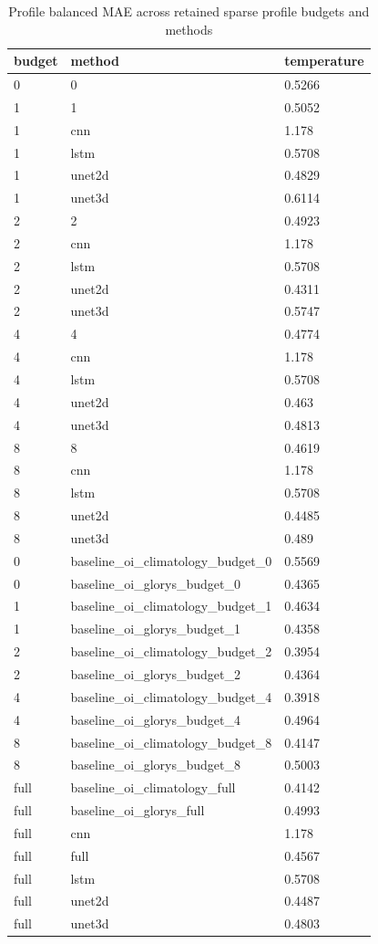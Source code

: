 \begin{table}[htbp]
\centering
\caption{Profile balanced MAE across retained sparse profile budgets and methods}
\begin{tabular}{lll}
\toprule
budget & method & temperature \\
\midrule
0 & 0 & 0.5266 \\
1 & 1 & 0.5052 \\
1 & cnn & 1.178 \\
1 & lstm & 0.5708 \\
1 & unet2d & 0.4829 \\
1 & unet3d & 0.6114 \\
2 & 2 & 0.4923 \\
2 & cnn & 1.178 \\
2 & lstm & 0.5708 \\
2 & unet2d & 0.4311 \\
2 & unet3d & 0.5747 \\
4 & 4 & 0.4774 \\
4 & cnn & 1.178 \\
4 & lstm & 0.5708 \\
4 & unet2d & 0.463 \\
4 & unet3d & 0.4813 \\
8 & 8 & 0.4619 \\
8 & cnn & 1.178 \\
8 & lstm & 0.5708 \\
8 & unet2d & 0.4485 \\
8 & unet3d & 0.489 \\
0 & baseline\_oi\_climatology\_budget\_0 & 0.5569 \\
0 & baseline\_oi\_glorys\_budget\_0 & 0.4365 \\
1 & baseline\_oi\_climatology\_budget\_1 & 0.4634 \\
1 & baseline\_oi\_glorys\_budget\_1 & 0.4358 \\
2 & baseline\_oi\_climatology\_budget\_2 & 0.3954 \\
2 & baseline\_oi\_glorys\_budget\_2 & 0.4364 \\
4 & baseline\_oi\_climatology\_budget\_4 & 0.3918 \\
4 & baseline\_oi\_glorys\_budget\_4 & 0.4964 \\
8 & baseline\_oi\_climatology\_budget\_8 & 0.4147 \\
8 & baseline\_oi\_glorys\_budget\_8 & 0.5003 \\
full & baseline\_oi\_climatology\_full & 0.4142 \\
full & baseline\_oi\_glorys\_full & 0.4993 \\
full & cnn & 1.178 \\
full & full & 0.4567 \\
full & lstm & 0.5708 \\
full & unet2d & 0.4487 \\
full & unet3d & 0.4803 \\
\bottomrule
\end{tabular}
\end{table}
